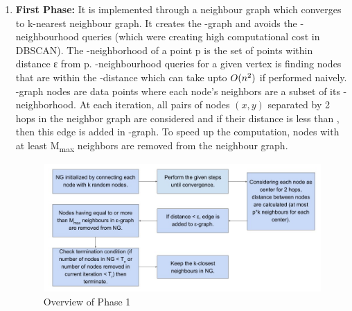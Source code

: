 \documentclass[acmsmall]{acmart}
\begin{document}
\begin{enumerate}
    \item \textbf{First Phase: } It is implemented through a neighbour graph which converges to k-nearest neighbour graph. It creates the \textepsilon-graph and avoids the \textepsilon-neighbourhood queries (which were creating high computational cost in DBSCAN). \newline
    The \textepsilon-neighborhood of a point p is the set of points within distance ε from p. \newline \textepsilon-neighbourhood queries for a given vertex is finding nodes that are within the \textepsilon-distance which can take upto $O(n\textsuperscript{2})$ if performed naively. \newline \textepsilon-graph nodes are data points where each node’s neighbors are a subset of its \textepsilon-neighborhood. \newline
    At each iteration, all pairs of nodes $(x,y)$ separated by 2 hops in the neighbor graph are considered and if their distance is less than \textepsilon, then this edge is added in \textepsilon-graph. To speed up the computation, nodes with at least M\textsubscript{max} neighbors are removed from the neighbour graph.
    
    \begin{figure}[!ht]
        \centering
        \includegraphics[width=\textwidth,height=\textheight,keepaspectratio]{Phase 1.jpeg}
        \vspace{-8mm}
        \caption{Overview of Phase 1}
        \label{fig:NG-DBSCAN Algorithm}
    \end{figure}
        

\end{enumerate}
\end{document}

